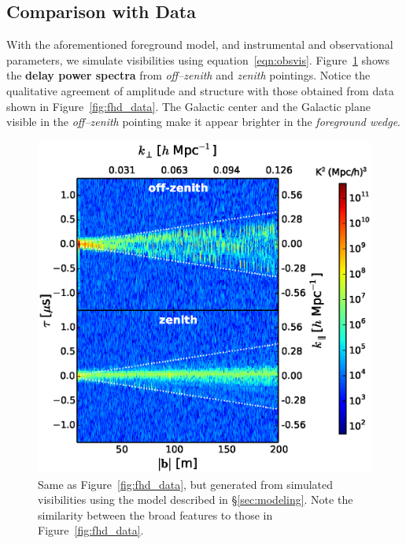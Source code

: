 \documentclass[preprint2,iop,numberedappendix]{emulateapj}
\begin{document}
\subsection{Comparison with Data}\label{sec:data-vs-model}

With the aforementioned foreground model, and instrumental and observational parameters, we simulate visibilities using equation~\ref{eqn:obsvis}. Figure~\ref{fig:sim_data} shows the {\bf delay power spectra} from {\it off--zenith} and {\it zenith} pointings. Notice the qualitative agreement of amplitude and structure with those obtained from data shown in Figure~\ref{fig:fhd_data}. The Galactic center and the Galactic plane visible in the {\it off--zenith} pointing make it appear brighter in the {\it foreground wedge}. 

\begin{figure}[htb]
\centering
\includegraphics[width=\linewidth]{fig8.eps}
\caption{Same as Figure~\ref{fig:fhd_data}, but generated from simulated visibilities using the model described in \S\ref{sec:modeling}. Note the similarity between the broad features to those in Figure~\ref{fig:fhd_data}. \label{fig:sim_data}}
\end{figure}
\end{document}
